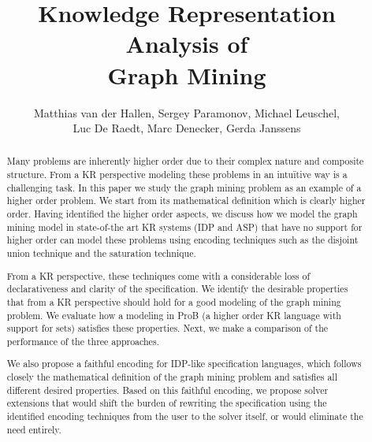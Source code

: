 \documentclass{new_tlp}
\author[]{Matthias van der Hallen, Sergey Paramonov, Michael Leuschel,\\ Luc De Raedt, Marc Denecker, Gerda Janssens}
\title{Knowledge Representation Analysis of\\ Graph Mining}
\begin{document}
\maketitle
\begin{abstract}
Many problems are inherently higher order due to their complex nature and composite structure. 
From a KR perspective modeling these problems in an intu\"itive way is a challenging task. 
In this paper we study the graph mining problem as an example of a higher order problem. 
We start from its mathematical definition which is clearly higher order. 
Having identified the higher order aspects, we discuss how we model the graph mining model 
in state-of-the art KR systems (IDP and ASP) that have no support for higher order can model these problems using encoding techniques such as the disjoint union technique and the saturation technique. 

From a KR perspective, these techniques come with a considerable loss of declarativeness and clarity of the specification. 
We identify the desirable properties that from a KR perspective should hold for a good modeling of the graph mining problem. 
We evaluate how a modeling in ProB (a higher order KR language with support for sets) satisfies these properties. 
Next, we make a comparison of the performance of the three approaches.

We also propose a faithful encoding for IDP-like specification languages, which follows closely the mathematical definition of the graph mining problem and satisfies all different desired properties.
Based on this faithful encoding,  we propose solver extensions that would shift the burden of rewriting the specification using the identified encoding techniques from the user to the solver itself, or would eliminate the need entirely.



\end{abstract}
\end{document}
